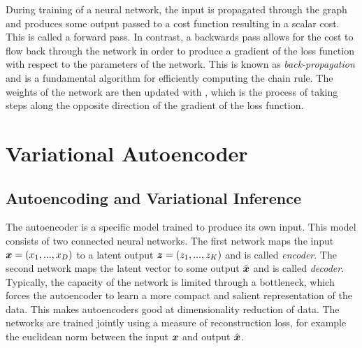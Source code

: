 During training of a neural network, the input is propagated through the graph and produces some output passed to a cost function resulting in a scalar cost. This is called a forward pass. In contrast, a backwards pass allows for the cost to flow back through the network in order to produce a gradient of the loss function with respect to the parameters of the network. This is known as \emph{back-propagation} and is a fundamental algorithm for efficiently computing the chain rule. The weights of the network are then updated with , which is the process of taking steps along the opposite direction of the gradient of the loss function. %



\section{Variational Autoencoder}

\subsection{Autoencoding and Variational Inference}

The autoencoder is a specific model trained to produce its own input. This model consists of two connected neural networks. The first network maps the input $\boldsymbol{x} = (x_1, ..., x_D)$ to a latent output $\boldsymbol{z} = (z_1, ..., z_K)$ and is called \emph{encoder}. The second network maps the latent vector to some output $\hat{\boldsymbol{x}}$ and is called \emph{decoder}. Typically, the capacity of the network is limited through a bottleneck, which forces the autoencoder to learn a more compact and salient representation of the data. This makes autoencoders good at dimensionality reduction of data. The networks are trained jointly using a measure of reconstruction loss, for example the euclidean norm between the input $\boldsymbol{x}$ and output $\hat{\boldsymbol{x}}$.


